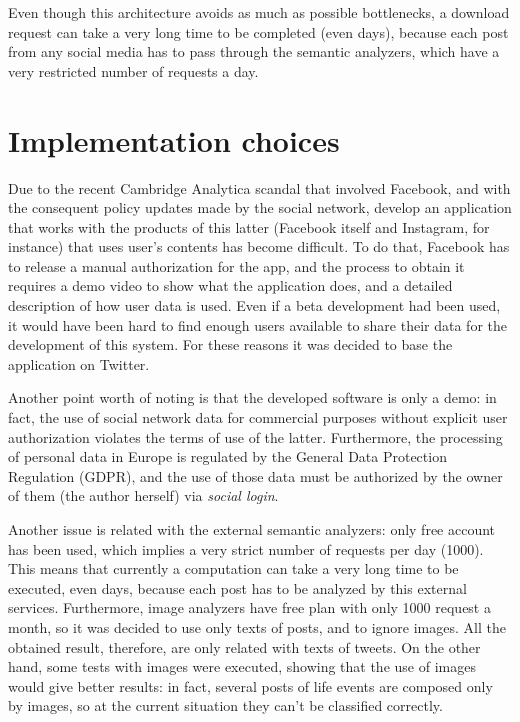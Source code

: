 Even though this architecture avoids as much as possible bottlenecks, a download request can take a very long time to be completed (even days), because each post from any social media has to pass through the semantic analyzers, which have a very restricted number of requests a day.

\section{Implementation choices}
\label{sec:choices}
Due to the recent Cambridge Analytica scandal that involved Facebook, and with the consequent policy updates made by the social network, develop an application that works with the products of this latter (Facebook itself and Instagram, for instance) that uses user's contents has become difficult. To do that, Facebook has to release a manual authorization for the app, and the process to obtain it requires a demo video to show what the application does, and a detailed description of how user data is used. Even if a beta development had been used, it would have been hard to find enough users available to share their data for the development of this system. For these reasons it was decided to base the application on Twitter.

Another point worth of noting is that the developed software is only a demo: in fact, the use of social network data for commercial purposes without explicit user authorization violates the terms of use of the latter. Furthermore, the processing of personal data in Europe is regulated by the General Data Protection Regulation (GDPR), and the use of those data must be authorized by the owner of them (the author herself) via \emph{social login}.

Another issue is related with the external semantic analyzers: only free account has been used, which implies a very strict number of requests per day (1000). This means that currently a computation can take a very long time to be executed, even days, because each post has to be analyzed by this external services. Furthermore, image analyzers have free plan with only 1000 request a month, so it was decided to use only texts of posts, and to ignore images. All the obtained result, therefore, are only related with texts of tweets. On the other hand, some tests with images were executed, showing that the use of images would give better results: in fact, several posts of life events are composed only by images, so at the current situation they can't be classified correctly.

